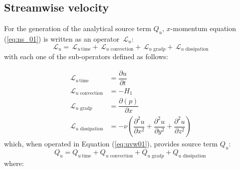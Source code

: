 \documentclass[10pt]{article}
\newcommand{\Diff}[2] {\dfrac{\partial( #1)}{\partial #2}}
\newcommand{\diff}[2] {\dfrac{\partial #1}{\partial #2}}
\newcommand{\Lo}{\,\mathcal{L}}
\newcommand{\convection}{\,\text{convection}}
\newcommand{\gradp}{\,\text{grad}p}
\newcommand{\dissipation}{\,\text{dissipation}}
\begin{document}
\subsection{Streamwise velocity}

For the generation of the analytical source term $Q_u$, $x$-momentum equation (\ref{eq:ns_01}) is written as an operator $\Lo_u$:
 $$\Lo_u = \Lo_{u \, \text{time}}+\Lo_{u \, \convection}+\Lo_{u \, \gradp }+\Lo_{u \, \dissipation }$$
with each one of the sub-operators defined as follows:

\begin{equation}
 \begin{split}
\Lo_{u \, \text{time}}&= \diff{u}{t}  \\
\Lo_{u \, \convection}&= -H_1\\
\Lo_{u \, \gradp }&= \Diff{p}{x}\\
\Lo_{u \, \dissipation }&= - \nu\left(\diff{^2 u}{ x^2}+\diff{^2 u}{ y^2}+\diff{^2 u}{ z^2} \right)
 \end{split}
\end{equation}
%
which, when operated in Equation (\ref{eq:uvw01}), provides source term $Q_{u}$:
\begin{equation*} 
Q_u = Q_{u \, \text{time}}+Q_{u \, \convection}+Q_{u \, \gradp }+Q_{u \, \dissipation }
\end{equation*}
where:
\end{document}
